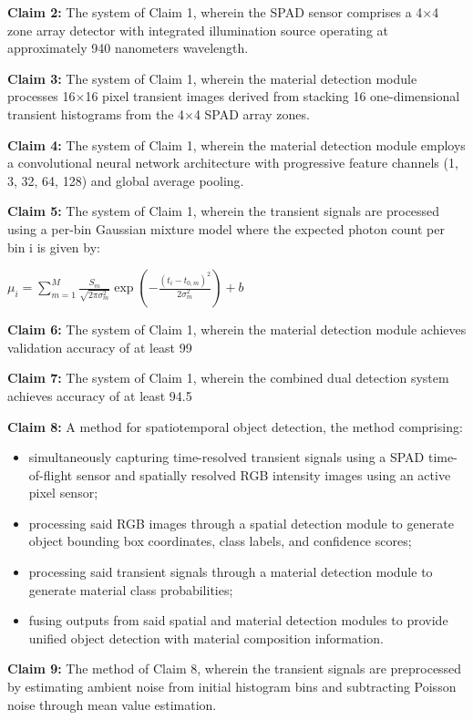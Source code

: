 \documentclass[11pt,a4paper]{article}
\begin{document}
\begin{enumerate}[leftmargin=*,label=\alph*)]
\textbf{Claim 2:} The system of Claim 1, wherein the SPAD sensor comprises a 4$\times$4 zone array detector with integrated illumination source operating at approximately 940 nanometers wavelength.

\textbf{Claim 3:} The system of Claim 1, wherein the material detection module processes 16$\times$16 pixel transient images derived from stacking 16 one-dimensional transient histograms from the 4$\times$4 SPAD array zones.

\textbf{Claim 4:} The system of Claim 1, wherein the material detection module employs a convolutional neural network architecture with progressive feature channels (1, 3, 32, 64, 128) and global average pooling.

\textbf{Claim 5:} The system of Claim 1, wherein the transient signals are processed using a per-bin Gaussian mixture model where the expected photon count per bin i is given by:

$\mu_i = \sum_{m=1}^{M} \frac{S_m}{\sqrt{2\pi\sigma_m^2}} \exp\left(-\frac{(t_i - t_{0,m})^2}{2\sigma_m^2}\right) + b$

\textbf{Claim 6:} The system of Claim 1, wherein the material detection module achieves validation accuracy of at least 99%

\textbf{Claim 7:} The system of Claim 1, wherein the combined dual detection system achieves accuracy of at least 94.5%

\textbf{Claim 8:} A method for spatiotemporal object detection, the method comprising:
\begin{itemize}[leftmargin=*]
\item simultaneously capturing time-resolved transient signals using a SPAD time-of-flight sensor and spatially resolved RGB intensity images using an active pixel sensor;
\item processing said RGB images through a spatial detection module to generate object bounding box coordinates, class labels, and confidence scores;
\item processing said transient signals through a material detection module to generate material class probabilities;
\item fusing outputs from said spatial and material detection modules to provide unified object detection with material composition information.
\end{itemize}

\textbf{Claim 9:} The method of Claim 8, wherein the transient signals are preprocessed by estimating ambient noise from initial histogram bins and subtracting Poisson noise through mean value estimation.


\end{enumerate}
\end{document}
